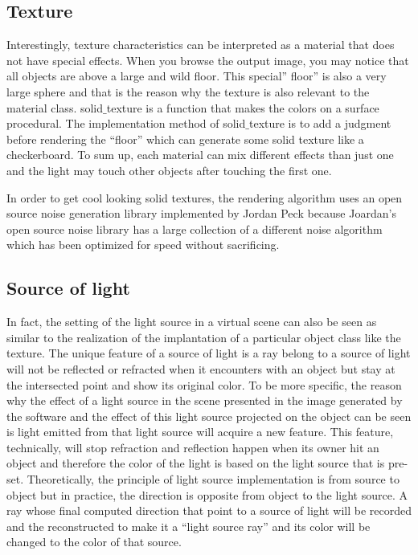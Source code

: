 \documentclass[11pt]{article}
\begin{document}
\subsection{Texture}
Interestingly, texture characteristics can be interpreted as a material that does not have special effects. When you browse the output image, you may notice that all objects are above a large and wild floor. This special” floor” is also a very large sphere and that is the reason why the texture is also relevant to the material class. solid$\_$texture is a function that makes the colors on a surface procedural. The implementation method of solid$\_$texture is to add a judgment before rendering the “floor” which can generate some solid texture like a checkerboard.
To sum up, each material can mix different effects than just one and the light may touch other objects after touching the first one.

In order to get cool looking solid textures, the rendering algorithm uses an open source noise generation library implemented by Jordan Peck because Joardan’s open source noise library has a large collection of a different noise algorithm which has been optimized for speed without sacrificing.

\subsection{Source of light}
In fact, the setting of the light source in a virtual scene can also be seen as similar to the realization of the implantation of a particular object class like the texture. The unique feature of a source of light is a ray belong to a source of light will not be reflected or refracted when it encounters with an object but stay at the intersected point and show its original color. To be more specific, the reason why the effect of a light source in the scene presented in the image generated by the software and the effect of this light source projected on the object can be seen is light emitted from that light source will acquire a new feature. This feature, technically, will stop refraction and reflection happen when its owner hit an object and therefore the color of the light is based on the light source that is pre-set. Theoretically, the principle of light source implementation is from source to object but in practice, the direction is opposite from object to the light source. A ray whose final computed direction that point to a source of light will be recorded and the reconstructed to make it a “light source ray” and its color will be changed to the color of that source.
\end{document}
